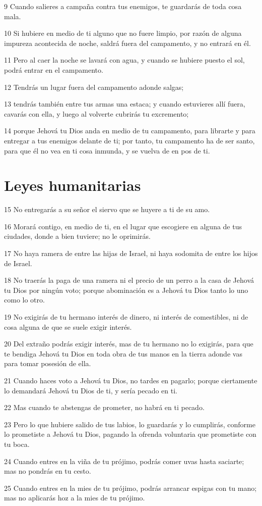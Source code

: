 \par 9 Cuando salieres a campaña contra tus enemigos, te guardarás de toda cosa mala.
\par 10 Si hubiere en medio de ti alguno que no fuere limpio, por razón de alguna impureza acontecida de noche, saldrá fuera del campamento, y no entrará en él.
\par 11 Pero al caer la noche se lavará con agua, y cuando se hubiere puesto el sol, podrá entrar en el campamento.
\par 12 Tendrás un lugar fuera del campamento adonde salgas;
\par 13 tendrás también entre tus armas una estaca; y cuando estuvieres allí fuera, cavarás con ella, y luego al volverte cubrirás tu excremento;
\par 14 porque Jehová tu Dios anda en medio de tu campamento, para librarte y para entregar a tus enemigos delante de ti; por tanto, tu campamento ha de ser santo, para que él no vea en ti cosa inmunda, y se vuelva de en pos de ti.

\section{Leyes humanitarias}

\par 15 No entregarás a su señor el siervo que se huyere a ti de su amo.
\par 16 Morará contigo, en medio de ti, en el lugar que escogiere en alguna de tus ciudades, donde a bien tuviere; no le oprimirás.
\par 17 No haya ramera de entre las hijas de Israel, ni haya sodomita de entre los hijos de Israel.
\par 18 No traerás la paga de una ramera ni el precio de un perro a la casa de Jehová tu Dios por ningún voto; porque abominación es a Jehová tu Dios tanto lo uno como lo otro.
\par 19 No exigirás de tu hermano interés de dinero, ni interés de comestibles, ni de cosa alguna de que se suele exigir interés.
\par 20 Del extraño podrás exigir interés, mas de tu hermano no lo exigirás, para que te bendiga Jehová tu Dios en toda obra de tus manos en la tierra adonde vas para tomar posesión de ella. 
\par 21 Cuando haces voto a Jehová tu Dios, no tardes en pagarlo; porque ciertamente lo demandará Jehová tu Dios de ti, y sería pecado en ti.
\par 22 Mas cuando te abstengas de prometer, no habrá en ti pecado. 
\par 23 Pero lo que hubiere salido de tus labios, lo guardarás y lo cumplirás, conforme lo prometiste a Jehová tu Dios, pagando la ofrenda voluntaria que prometiste con tu boca.
\par 24 Cuando entres en la viña de tu prójimo, podrás comer uvas hasta saciarte; mas no pondrás en tu cesto.
\par 25 Cuando entres en la mies de tu prójimo, podrás arrancar espigas con tu mano; mas no aplicarás hoz a la mies de tu prójimo. 


